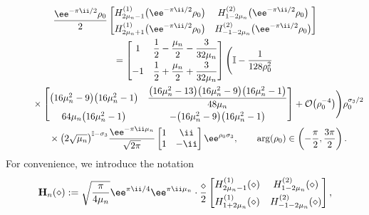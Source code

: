 \begin{gather}
\dfrac{\ee^{-\pi \ii /2}\rho_0}{2} \begin{bmatrix} H^{(1)}_{2\mu_n-1}\big(\ee^{-\pi \ii/2} \rho_0\big) & H^{(2)}_{1 -2\mu_n}\big(\ee^{-\pi \ii/2} \rho_0\big)\vspace{1mm}\\ H^{(1)}_{2\mu_n + 1}\big(\ee^{-\pi \ii/2} \rho_0\big) & H^{(2)}_{-1-2\mu_n}\big(\ee^{-\pi \ii/2} \rho_0\big)\end{bmatrix} \nonumber\\
\qquad= \begin{bmatrix} 1 & \dfrac{1}{2} - \dfrac{\mu_n}{2} - \dfrac{3}{32\mu_n} \vspace{1mm}\\ -1 & \dfrac{1}{2} + \dfrac{\mu_n}{2} + \dfrac{3}{32\mu_n} \end{bmatrix} \Biggl( \mathbb{I} - \dfrac{1}{128 \rho_0^2}  \nonumber\\
\phantom{\qquad=}{}  \times\begin{bmatrix} \big(16\mu_n^2 - 9\big)\big(16\mu_n^2 - 1\big) & \dfrac{\big(16 \mu_n^2 - 13\big)\big(16\mu_n^2 - 9\big)\big(16\mu_n^2 - 1\big)}{48\mu_n} \vspace{1mm}\\ 64\mu_n\big(16\mu_n^2 - 1\big) & - \big(16\mu_n^2 - 9\big)\big(16\mu_n^2 - 1\big)\end{bmatrix} + \mathcal{O}\big(\rho_0^{-4}\big) \Biggr) \rho_0^{\sigma_3/2}\nonumber\\
\phantom{\qquad=}{} \times \big(2\sqrt{\mu_n}\big)^{\mathbb{I}-\sigma_3}{\dfrac{\ee^{-\pi \ii \mu_n}}{\sqrt{2\pi}}} {}{} \begin{bmatrix} 1 & \ii\\ 1 &-\ii \end{bmatrix} \ee^{ \rho_0 \sigma_3}, \qquad \arg(\rho_0) \in \left( -\dfrac{\pi}{2}, \dfrac{3\pi}{2} \right).
\label{eq:H-expand-zero}
\end{gather}
For convenience, we introduce the notation
\begin{equation}
 \mathbf{H}_n(\diamond) := \sqrt{\dfrac{\pi}{4\mu_n}} \ee^{\pi \ii/4 }\ee^{\pi \ii \mu_n} \cdot \dfrac{\diamond}{2} \begin{bmatrix} H^{(1)}_{2\mu_n - 1}(\diamond) & H^{(2)}_{1 - 2\mu_n }(\diamond) \vspace{1mm}\\ H^{(1)}_{1 + 2\mu_n}(\diamond) & H^{(2)}_{-1-2\mu_n}(\diamond) \end{bmatrix},
 \label{eq:Bn-def}
\end{equation}
